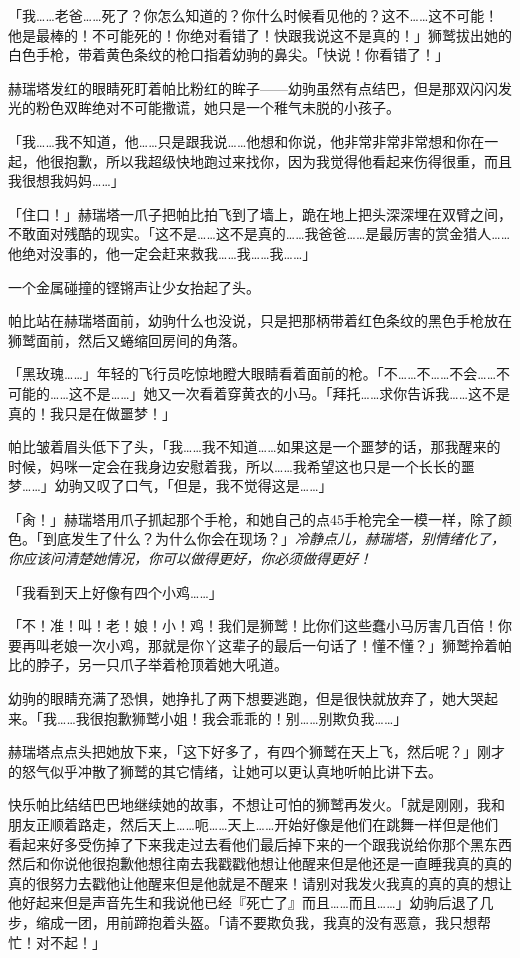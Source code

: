 「我……老爸……死了？你怎么知道的？你什么时候看见他的？这不……这不可能！他是最棒的！不可能死的！你绝对看错了！快跟我说这不是真的！」狮鹫拔出她的白色手枪，带着黄色条纹的枪口指着幼驹的鼻尖。「快说！你看错了！」

赫瑞塔发红的眼睛死盯着帕比粉红的眸子——幼驹虽然有点结巴，但是那双闪闪发光的粉色双眸绝对不可能撒谎，她只是一个稚气未脱的小孩子。

「我……我不知道，他……只是跟我说……他想和你说，他非常非常非常想和你在一起，他很抱歉，所以我超级快地跑过来找你，因为我觉得他看起来伤得很重，而且我很想我妈妈……」

「住口！」赫瑞塔一爪子把帕比拍飞到了墙上，跪在地上把头深深埋在双臂之间，不敢面对残酷的现实。「这不是……这不是真的……我爸爸……是最厉害的赏金猎人……他绝对没事的，他一定会赶来救我……我……我……」

一个金属碰撞的铿锵声让少女抬起了头。

帕比站在赫瑞塔面前，幼驹什么也没说，只是把那柄带着红色条纹的黑色手枪放在狮鹫面前，然后又蜷缩回房间的角落。

「黑玫瑰……」年轻的飞行员吃惊地瞪大眼睛看着面前的枪。「不……不……不会……不可能的……这不是……」她又一次看着穿黄衣的小马。「拜托……求你告诉我……这不是真的！我只是在做噩梦！」

帕比皱着眉头低下了头，「我……我不知道……如果这是一个噩梦的话，那我醒来的时候，妈咪一定会在我身边安慰着我，所以……我希望这也只是一个长长的噩梦……」幼驹又叹了口气，「但是，我不觉得这是……」

「肏！」赫瑞塔用爪子抓起那个手枪，和她自己的点45手枪完全一模一样，除了颜色。「到底发生了什么？为什么你会在现场？」\emph{冷静点儿，赫瑞塔，别情绪化了，你应该问清楚她情况，你可以做得更好，你必须做得更好！}


「我看到天上好像有四个小鸡……」

「不！准！叫！老！娘！小！鸡！我们是狮鹫！比你们这些蠢小马厉害几百倍！你要再叫老娘一次小鸡，那就是你丫这辈子的最后一句话了！懂不懂？」狮鹫拎着帕比的脖子，另一只爪子举着枪顶着她大吼道。

幼驹的眼睛充满了恐惧，她挣扎了两下想要逃跑，但是很快就放弃了，她大哭起来。「我……我很抱歉狮鹫小姐！我会乖乖的！别……别欺负我……」

赫瑞塔点点头把她放下来，「这下好多了，有四个狮鹫在天上飞，然后呢？」刚才的怒气似乎冲散了狮鹫的其它情绪，让她可以更认真地听帕比讲下去。

快乐帕比结结巴巴地继续她的故事，不想让可怕的狮鹫再发火。「就是刚刚，我和朋友正顺着路走，然后天上……呃……天上……开始好像是他们在跳舞一样但是他们看起来好多受伤掉了下来我走过去看他们最后掉下来的一个跟我说给你那个黑东西然后和你说他很抱歉他想往南去我戳戳他想让他醒来但是他还是一直睡我真的真的真的很努力去戳他让他醒来但是他就是不醒来！请别对我发火我真的真的真的想让他好起来但是声音先生和我说他已经『死亡了』而且……而且……」幼驹后退了几步，缩成一团，用前蹄抱着头盔。「请不要欺负我，我真的没有恶意，我只想帮忙！对不起！」

